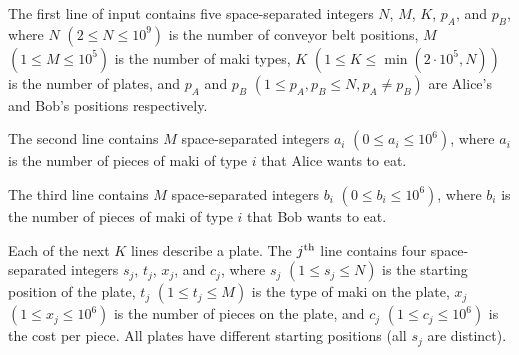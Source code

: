 
The first line of input contains five space-separated integers $N$, $M$, $K$, $p_A$, and $p_B$, where
$N$ $(2 \leq N \leq 10^{9})$ is the number of conveyor belt positions,
$M$ $(1 \leq M \leq 10^{5})$ is the number of maki types,
$K$ $(1 \leq K \leq \min(2 \cdot 10^{5}, N))$ is the number of plates, and
$p_A$ and $p_B$ $(1 \leq p_A, p_B \leq N, p_A \not= p_B)$ are Alice's and Bob's positions respectively.

The second line contains $M$ space-separated integers $a_i$ $(0 \leq a_i \leq 10^6)$, where
$a_i$ is the number of pieces of maki of type $i$ that Alice wants to eat.

The third line contains $M$ space-separated integers $b_i$ $(0 \leq b_i \leq 10^6)$, where
$b_i$ is the number of pieces of maki of type $i$ that Bob wants to eat.

Each of the next $K$ lines describe a plate. The $j\textsuperscript{th}$ line
contains four space-separated integers $s_j$, $t_j$, $x_j$, and $c_j$, where
$s_j$ $(1 \leq s_j \leq N)$ is the starting position of the plate,
$t_j$ $(1 \leq t_j \leq M)$ is the type of maki on the plate,
$x_j$ $(1 \leq x_j \leq 10^6)$ is the number of pieces on the plate, and
$c_j$ $(1 \leq c_j \leq 10^6)$ is the cost per piece.
All plates have different starting positions (all $s_j$ are distinct).

